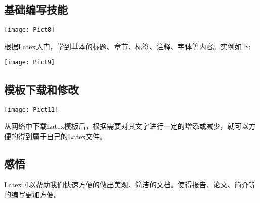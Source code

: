 \documentclass[a4paper, 12pt]{article}
\begin{document}
\subsection{\small 基础编写技能}
\texttt{[image: Pict8]}

根据Latex入门，学到基本的标题、章节、标签、注释、字体等内容。实例如下:  

\texttt{[image: Pict9]}
\subsection{\small 模板下载和修改}
\texttt{[image: Pict11]}

从网络中下载Latex模板后，根据需要对其文字进行一定的增添或减少，就可以方便的得到属于自己的Latex文件。
\subsection{\small 感悟}
Latex可以帮助我们快速方便的做出美观、简洁的文档。使得报告、论文、简介等的编写更加方便。
\end{document}
